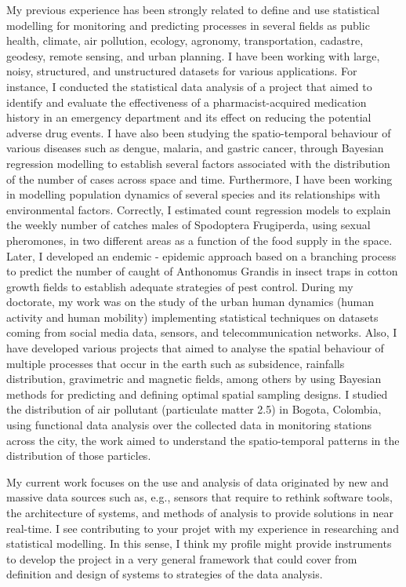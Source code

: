 \documentclass[11pt, a4paper]{awesome-cv}
\begin{document}
\begin{cvletter}
My previous experience has been strongly related to define and use statistical modelling for monitoring and predicting processes in several fields as public health, climate, air pollution, ecology, agronomy, transportation, cadastre, geodesy, remote sensing, and urban planning. I have been working with large, noisy, structured, and unstructured datasets for various applications. For instance, I conducted the statistical data analysis of a project that aimed to identify and evaluate the effectiveness of a pharmacist-acquired medication history in an emergency department and its effect on reducing the potential adverse drug events. I have also been studying the spatio-temporal behaviour of various diseases such as dengue, malaria, and gastric cancer, through Bayesian regression modelling to establish several factors associated with the distribution of the number of cases across space and time. Furthermore, I have been working in modelling population dynamics of several species and its relationships with environmental factors. Correctly, I estimated count regression models to explain the weekly number of catches males of Spodoptera Frugiperda, using sexual pheromones, in two different areas as a function of the food supply in the space. Later, I developed an endemic - epidemic approach based on a branching process to predict the number of caught of Anthonomus Grandis in insect traps in cotton growth fields to establish adequate strategies of pest control. During my doctorate, my work was on the study of the urban human dynamics (human activity and human mobility) implementing statistical techniques on datasets coming from social media data, sensors, and telecommunication networks. Also, I have developed various projects that aimed to analyse the spatial behaviour of multiple processes that occur in the earth such as subsidence, rainfalls distribution, gravimetric and magnetic fields, among others by using Bayesian methods for predicting and defining optimal spatial sampling designs. I studied the distribution of air pollutant (particulate matter 2.5) in Bogota, Colombia, using functional data analysis over the collected data in monitoring stations across the city, the work aimed to understand the spatio-temporal patterns in the distribution of those particles.\par
My current work focuses on the use and analysis of data originated by new and massive data sources such as, e.g., sensors that require to rethink software tools, the architecture of systems, and methods of analysis to provide solutions in near real-time. I see contributing to your projet with my experience in researching and statistical modelling. In this sense, I think my profile might provide instruments to develop the project in a very general framework that could cover from definition and design of systems to strategies of the data analysis.\par

\end{cvletter}
\end{document}
